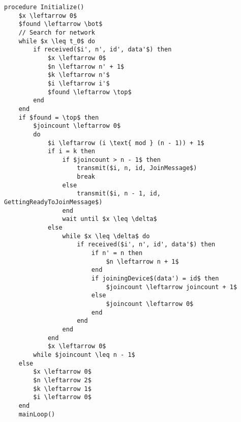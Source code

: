 \begin{minipage}{\linewidth} %
\begin{lstlisting}[label=lst:setupCCRC,style=pseudocode,mathescape=true,caption={Pseudocode example of the special case procedure Initialize()},basicstyle=\ttfamily]
procedure Initialize()
	$x \leftarrow 0$
	$found \leftarrow \bot$
	// Search for network
	while $x \leq t_0$ do
		if received($i', n', id', data'$) then
			$x \leftarrow 0$
			$n \leftarrow n' + 1$
			$k \leftarrow n'$
			$i \leftarrow i'$
			$found \leftarrow \top$
		end
	end	
	if $found = \top$ then
		$joincount \leftarrow 0$
		do
			$i \leftarrow (i \text{ mod } (n - 1)) + 1$
			if i = k then
				if $joincount > n - 1$ then
					transmit($i, n, id, JoinMessage$)
					break
				else 
					transmit($i, n - 1, id, GettingReadyToJoinMessage$)
				end
				wait until $x \leq \delta$ 
			else
				while $x \leq \delta$ do
					if received($i', n', id', data'$) then
						if n' = n then
							$n \leftarrow n + 1$
						end
						if joiningDevice$(data') = id$ then
							$joincount \leftarrow joincount + 1$
						else
							$joincount \leftarrow 0$
						end
					end
				end
			end
			$x \leftarrow 0$
		while $joincount \leq n - 1$
	else
		$x \leftarrow 0$
		$n \leftarrow 2$
		$k \leftarrow 1$
		$i \leftarrow 0$
	end
	mainLoop()
\end{lstlisting}   
\end{minipage}
